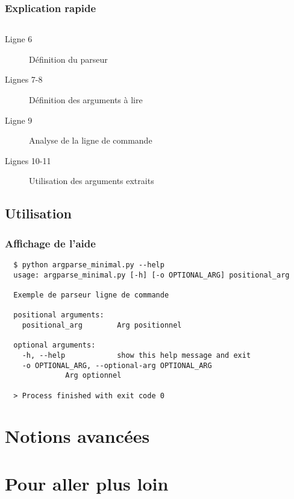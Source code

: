 \documentclass{beamer}
\begin{document}
\begin{frame}
 \frametitle{Explication rapide}
   
\inputminted[linenos=true, fontsize=\fontsize{3}{4}, frame=single]{python}{py_src/py_argparse/argparse_minimal.py}

\begin{description}
 \item[Ligne 6] Définition du parseur
 \item[Lignes 7-8] Définition des arguments à lire
 \item[Ligne 9] Analyse de la ligne de commande
 \item[Lignes 10-11] Utilisation des arguments extraits
\end{description}

\end{frame}

\subsection{Utilisation}

\begin{frame}[fragile]
 \frametitle{Affichage de l'aide}
 
  \begin{tcolorbox}[left=2pt, width=\textwidth,colback={ttybg},title={Console}, colupper=ttyfg]
  \begin{scriptsize}

  \begin{verbatim}
  $ python argparse_minimal.py --help
  usage: argparse_minimal.py [-h] [-o OPTIONAL_ARG] positional_arg

  Exemple de parseur ligne de commande

  positional arguments:
    positional_arg        Arg positionnel

  optional arguments:
    -h, --help            show this help message and exit
    -o OPTIONAL_ARG, --optional-arg OPTIONAL_ARG
			  Arg optionnel

  > Process finished with exit code 0 

  \end{verbatim}
  \end{scriptsize}
  
 \end{tcolorbox}

\end{frame}

\section{Notions avancées}

\section{Pour aller plus loin}
\end{document}
